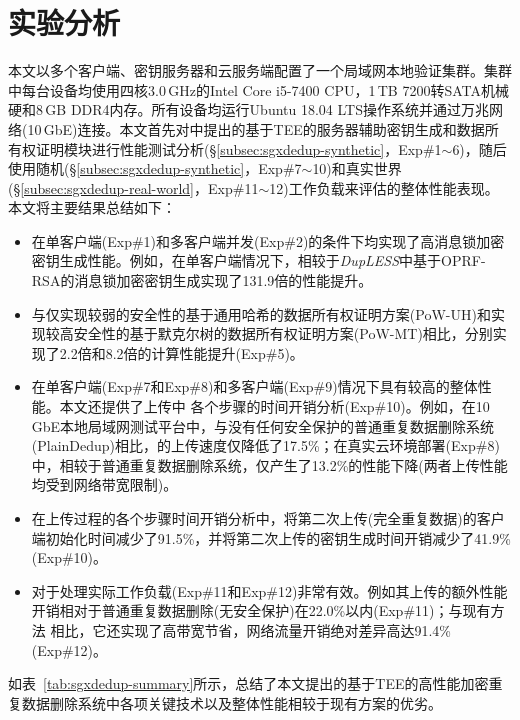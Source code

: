 \section{实验分析}
\label{sec:sgxdedup-evaluation}

本文以多个客户端、密钥服务器和云服务端配置了一个局域网本地验证集群。集群中每台设备均使用四核3.0\,GHz的Intel Core i5-7400 CPU，1\,TB 7200转SATA机械硬和8\,GB DDR4内存。所有设备均运行Ubuntu 18.04 LTS操作系统并通过万兆网络(10\,GbE)连接。本文首先对\sysnameS 中提出的基于TEE的服务器辅助密钥生成和数据所有权证明模块进行性能测试分析(\S\ref{subsec:sgxdedup-synthetic}，Exp\#1$\sim$6)，随后使用随机(\S\ref{subsec:sgxdedup-synthetic}，Exp\#7$\sim$10)和真实世界(\S\ref{subsec:sgxdedup-real-world}，Exp\#11$\sim$12)工作负载来评估\sysnameS 的整体性能表现。本文将主要结果总结如下：

\begin{itemize}
    \item \sysnameS 在单客户端(Exp\#1)和多客户端并发(Exp\#2)的条件下均实现了高消息锁加密密钥生成性能。例如，在单客户端情况下，相较于{\em DupLESS}\cite{bellare2013DupLESS}中基于OPRF-RSA的消息锁加密密钥生成实现了131.9倍的性能提升。
    \item \sysnameS 与仅实现较弱的安全性的基于通用哈希的数据所有权证明方案(PoW-UH)\cite{xu2013weak}和实现较高安全性的基于默克尔树的数据所有权证明方案(PoW-MT)\cite{halevi11}相比，分别实现了2.2倍和8.2倍的计算性能提升(Exp\#5)。
    \item \sysnameS 在单客户端(Exp\#7和Exp\#8)和多客户端(Exp\#9)情况下具有较高的整体性能。本文还提供了上传中 \sysnameS 各个步骤的时间开销分析(Exp\#10)。例如，在10\,GbE本地局域网测试平台中，与没有任何安全保护的普通重复数据删除系统(PlainDedup)相比，\sysnameS 的上传速度仅降低了17.5\%；在真实云环境部署(Exp\#8)中，相较于普通重复数据删除系统，\sysnameS 仅产生了13.2\%的性能下降(两者上传性能均受到网络带宽限制)。
    \item 在上传过程的各个步骤时间开销分析中，\sysnameS 将第二次上传(完全重复数据)的客户端初始化时间减少了91.5\%，并将第二次上传的密钥生成时间开销减少了41.9\%(Exp\#10)。
    \item \sysnameS 对于处理实际工作负载(Exp\#11和Exp\#12)非常有效。例如其上传的额外性能开销相对于普通重复数据删除(无安全保护)在22.0\%以内(Exp\#11)；与现有方法\cite{li15,harnik2010side} 相比，它还实现了高带宽节省，网络流量开销绝对差异高达91.4\%(Exp\#12)。
\end{itemize}

如表~\ref{tab:sgxdedup-summary}所示，总结了本文提出的基于TEE的高性能加密重复数据删除系统\sysnameS 中各项关键技术以及整体性能相较于现有方案的优劣。

